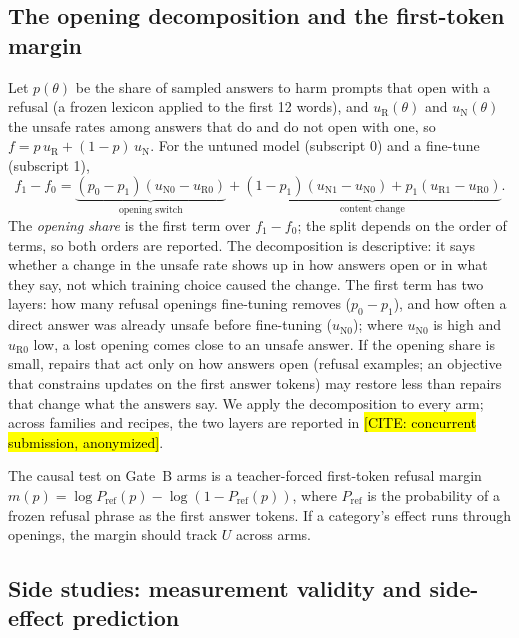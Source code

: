 \documentclass{article}
\theoremstyle{plain}
\theoremstyle{definition}
\theoremstyle{remark}
\newcommand{\ph}[1]{\hl{#1}}
\begin{document}
\subsection{The opening decomposition and the first-token margin}
\label{app:opening}

Let $p(\theta)$ be the share of sampled answers to harm prompts that open with
a refusal (a frozen lexicon applied to the first 12 words), and
$u_{\mathrm{R}}(\theta)$ and $u_{\mathrm{N}}(\theta)$ the unsafe rates among
answers that do and do not open with one, so
$f = p\,u_{\mathrm{R}} + (1-p)\,u_{\mathrm{N}}$. For the untuned model
(subscript 0) and a fine-tune (subscript 1),
\begin{equation*}
  f_1 - f_0 = \underbrace{(p_0 - p_1)(u_{\mathrm{N}0} - u_{\mathrm{R}0})}_{\text{opening switch}}
  + \underbrace{(1-p_1)(u_{\mathrm{N}1} - u_{\mathrm{N}0}) + p_1 (u_{\mathrm{R}1} - u_{\mathrm{R}0})}_{\text{content change}}.
\end{equation*}
The \emph{opening share} is the first term over $f_1 - f_0$; the split depends
on the order of terms, so both orders are reported. The decomposition is
descriptive: it says whether a change in the unsafe rate shows up in how
answers open or in what they say, not which training choice caused the change.
The first term has two layers: how many refusal openings fine-tuning removes
($p_0 - p_1$), and how often a direct answer was already unsafe before
fine-tuning ($u_{\mathrm{N}0}$); where $u_{\mathrm{N}0}$ is high and
$u_{\mathrm{R}0}$ low, a lost opening comes close to an unsafe answer. If the
opening share is small, repairs that act only on how answers open (refusal
examples; an objective that constrains updates on the first answer tokens) may
restore less than repairs that change what the answers say. We apply the
decomposition to every arm; across families and recipes, the two layers are
reported in \ph{[CITE: concurrent submission, anonymized]}.

The causal test on Gate~B arms is a teacher-forced first-token refusal margin
$m(p) = \log P_{\mathrm{ref}}(p) - \log(1 - P_{\mathrm{ref}}(p))$, where
$P_{\mathrm{ref}}$ is the probability of a frozen refusal phrase as the first
answer tokens. If a category's effect runs through openings, the margin should
track $U$ across arms.

\subsection{Side studies: measurement validity and side-effect prediction}
\label{app:side}
\end{document}
